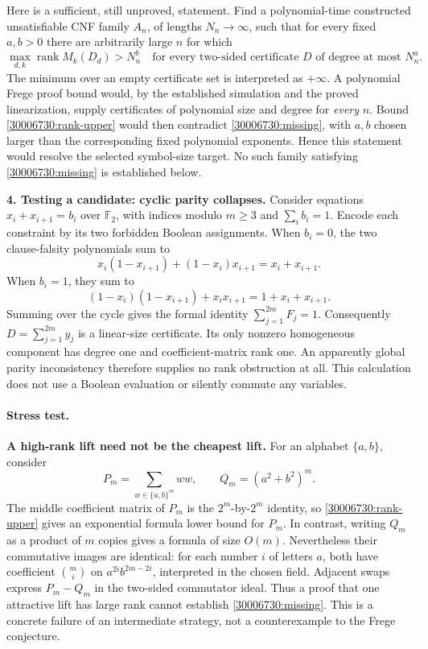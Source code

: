 \documentclass[11pt,a4paper]{article}
\numberwithin{equation}{section}
\begin{document}
Here is a sufficient, still unproved, statement. Find a polynomial-time
constructed unsatisfiable CNF family $A_n$, of lengths $N_n\to\infty$, such
that for every fixed $a,b>0$ there are arbitrarily large $n$ for which
\begin{equation}\label{30006730:missing}
 \max_{d,k}\operatorname{rank}M_k(D_d)>N_n^b
 \quad\text{for every two-sided certificate $D$ of degree at most $N_n^a$.}
\end{equation}
The minimum over an empty certificate set is interpreted as $+\infty$.
A polynomial Frege proof bound would, by the established simulation and the
proved linearization, supply certificates of polynomial size and degree
for \emph{every} $n$. Bound \eqref{30006730:rank-upper} would then contradict
\eqref{30006730:missing}, with $a,b$ chosen larger than the corresponding fixed
polynomial exponents. Hence this statement would resolve the selected
symbol-size target. No such family satisfying \eqref{30006730:missing} is
established below.

\medskip
\textbf{4. Testing a candidate: cyclic parity collapses.}
Consider equations $x_i+x_{i+1}=b_i$ over $\mathbb F_2$, with indices modulo
$m\geq3$ and $\sum_i b_i=1$. Encode each constraint by its two forbidden
Boolean assignments. When $b_i=0$, the two clause-falsity polynomials sum to
\[
 x_i(1-x_{i+1})+(1-x_i)x_{i+1}=x_i+x_{i+1}.
\]
When $b_i=1$, they sum to
\[
 (1-x_i)(1-x_{i+1})+x_ix_{i+1}=1+x_i+x_{i+1}.
\]
Summing over the cycle gives the formal identity $\sum_{j=1}^{2m}F_j=1$.
Consequently $D=\sum_{j=1}^{2m}y_j$ is a linear-size certificate. Its only
nonzero homogeneous component has degree one and coefficient-matrix rank
one. An apparently global parity inconsistency therefore supplies no rank
obstruction at all. This calculation does not use a Boolean evaluation or
silently commute any variables.

\paragraph{Stress test.}
\textbf{A high-rank lift need not be the cheapest lift.}
For an alphabet $\{a,b\}$, consider
\[
 P_m=\sum_{w\in\{a,b\}^m}ww,\qquad Q_m=(a^2+b^2)^m.
\]
The middle coefficient matrix of $P_m$ is the $2^m$-by-$2^m$ identity, so
\eqref{30006730:rank-upper} gives an exponential formula lower bound for $P_m$.
In contrast, writing $Q_m$ as a product of $m$ copies gives a formula of size
$O(m)$. Nevertheless their commutative images are identical: for each
number $i$ of letters $a$, both have coefficient $\binom mi$ on
$a^{2i}b^{2m-2i}$, interpreted in the chosen field. Adjacent swaps express
$P_m-Q_m$ in the two-sided commutator ideal. Thus a proof that one attractive
lift has large rank cannot establish \eqref{30006730:missing}. This is a concrete
failure of an intermediate strategy, not a counterexample to the Frege
conjecture.
\end{document}

